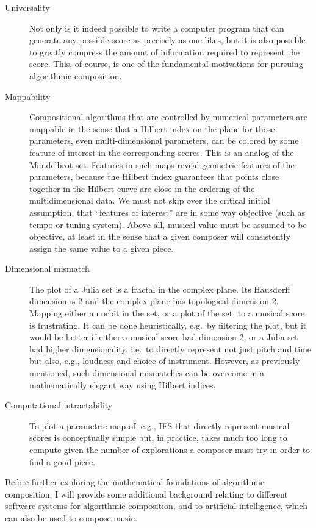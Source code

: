 \documentclass[11pt]{scrartcl}
\begin{document}
\begin{description}
\item[Universality] Not only is it indeed possible to write a computer program that can generate any possible score as precisely as one likes, but it is also possible to greatly compress the amount of information required to represent the score. This, of course, is one of the fundamental motivations for pursuing algorithmic composition.
\item[Mappability] Compositional algorithms that are controlled by numerical parameters are mappable in the sense that a Hilbert index \parencite{patrick1968mapping, hamilton2007compact} on the plane for those parameters, even multi-dimensional parameters, can be colored by some feature of interest in the corresponding scores. This is an analog of the Mandelbrot set. Features in such maps reveal geometric features of the parameters, because the Hilbert index guarantees that points close together in the Hilbert curve are close in the ordering of the multidimensional data. We must not skip over the critical initial assumption, that ``features of interest'' are in some way objective (such as tempo or tuning system). Above all, musical value must be assumed to be objective, at least in the sense that a given composer will consistently assign the same value to a given piece.
\item[Dimensional mismatch] The plot of a Julia set is a fractal in the complex plane. Its Hausdorff dimension is 2 and the complex plane has topological dimension 2. Mapping either an orbit in the set, or a plot of the set, to a musical score is frustrating. It can be done heuristically, e.g.\ by filtering the plot, but it would be better if either a musical score had dimension 2, or a Julia set had higher dimensionality, i.e.\ to directly represent not just pitch and time but also, e.g., loudness and choice of instrument. However, as previously mentioned, such  dimensional mismatches can be overcome in a mathematically elegant way using Hilbert indices.
\item[Computational intractability] To plot a parametric map of, e.g., IFS that directly represent musical scores is conceptually simple but, in practice, takes much too long to compute given the number of explorations a composer must try in order to find a good piece.
\end{description}

Before further exploring the mathematical foundations of algorithmic composition, I will provide some additional background relating to different software systems for algorithmic composition, and to artificial intelligence, which can also be used to compose music.
\end{document}
